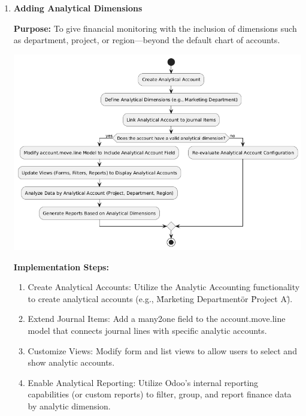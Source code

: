 \documentclass[11pt,a4paper]{article}
\begin{document}
\begin{enumerate}
        \item \textbf{Adding Analytical Dimensions}
        
        \textbf{Purpose:} To give financial monitoring with the inclusion of dimensions such as department, project, or 
        region—beyond the default chart of accounts.
        \medskip

        \begin{minipage}{0.5\textwidth}
            \centering
            \includegraphics[width=\linewidth]{diagram/adding_analytical_dimensions.png}
        \end{minipage}%
        \hfill
        \begin{minipage}{0.45\textwidth}
                \textbf{Implementation Steps:}
                \begin{enumerate}
                    \item Create Analytical Accounts: Utilize the Analytic Accounting functionality to create analytical accounts (e.g., \"Marketing Department\" or \"Project A\").
                    \item Extend Journal Items: Add a many2one field to the account.move.line model that connects 
                    journal lines with specific analytic accounts.
                    \item Customize Views: Modify form and list views to allow users to select and show analytic accounts.
                    \item Enable Analytical Reporting: Utilize Odoo's internal reporting capabilities (or custom reports) 
                    to filter, group, and report finance data by analytic dimension.
                \end{enumerate}
        \end{minipage}


\end{enumerate}
\end{document}
